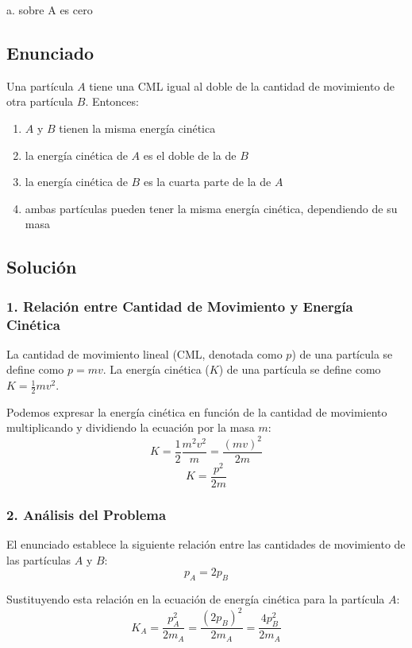 \documentclass[12pt, a4paper]{article}
\begin{document}
\begin{tcolorbox}[colback=green!5!white, colframe=green!50!black, title=Respuesta Correcta]
\centering \Large a. sobre A es cero
\end{tcolorbox}

\newpage

\subsection*{Enunciado}
Una partícula $A$ tiene una CML igual al doble de la cantidad de movimiento de otra partícula $B$. Entonces:
\begin{enumerate}[label=\alph*.]
    \item $A$ y $B$ tienen la misma energía cinética
    \item la energía cinética de $A$ es el doble de la de $B$
    \item la energía cinética de $B$ es la cuarta parte de la de $A$
    \item ambas partículas pueden tener la misma energía cinética, dependiendo de su masa
\end{enumerate}

\subsection*{Solución}

\subsubsection*{1. Relación entre Cantidad de Movimiento y Energía Cinética}
La cantidad de movimiento lineal (CML, denotada como $p$) de una partícula se define como $p = mv$.
La energía cinética ($K$) de una partícula se define como $K = \frac{1}{2}mv^2$.

Podemos expresar la energía cinética en función de la cantidad de movimiento multiplicando y dividiendo la ecuación por la masa $m$:
$$K = \frac{1}{2} \frac{m^2 v^2}{m} = \frac{(mv)^2}{2m}$$
$$K = \frac{p^2}{2m}$$

\subsubsection*{2. Análisis del Problema}
El enunciado establece la siguiente relación entre las cantidades de movimiento de las partículas $A$ y $B$:
$$p_A = 2 p_B$$

Sustituyendo esta relación en la ecuación de energía cinética para la partícula $A$:
$$K_A = \frac{p_A^2}{2m_A} = \frac{(2p_B)^2}{2m_A} = \frac{4p_B^2}{2m_A}$$
\end{document}
